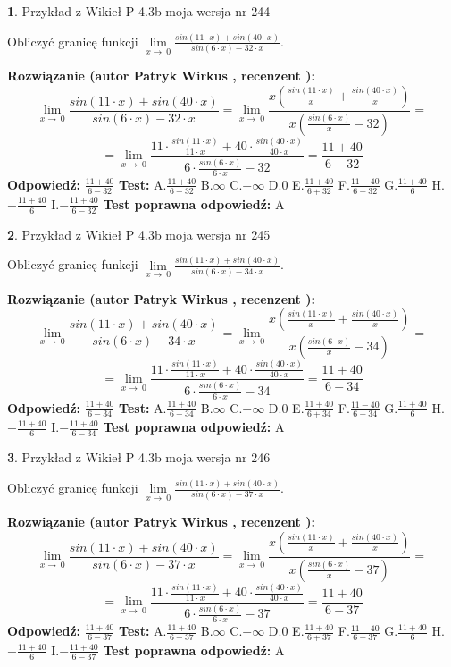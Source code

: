 \documentclass[12pt, a4paper]{article}
\theoremstyle{definition} %
\newtheorem{zad}{}
\newcommand{\zadStart}[1]{\begin{zad}#1\newline}
\newcommand{\zadStop}{\end{zad}}
\newcommand{\rozwStart}[2]{\noindent \textbf{Rozwiązanie (autor #1 , recenzent #2): }\newline}
\newcommand{\rozwStop}{\newline}
\newcommand{\odpStart}{\noindent \textbf{Odpowiedź:}\newline}
\newcommand{\odpStop}{\newline}
\newcommand{\testStart}{\noindent \textbf{Test:}\newline}
\newcommand{\testStop}{\newline}
\newcommand{\kluczStart}{\noindent \textbf{Test poprawna odpowiedź:}\newline}
\newcommand{\kluczStop}{\newline}
\begin{document}
\zadStart{Przykład z Wikieł P 4.3b moja wersja nr 244}


Obliczyć granicę funkcji $\lim\limits_{x\to\ 0}\frac{sin(11 \cdot x)+sin(40 \cdot x)}{sin(6 \cdot x)-32 \cdot x}$.
\zadStop
\rozwStart{Patryk Wirkus}{}
$$\lim\limits_{x\to\ 0}\frac{sin(11 \cdot x)+sin(40 \cdot x)}{sin(6 \cdot x)-32 \cdot x}=\lim\limits_{x\to\ 0}\frac{x(\frac{sin(11 \cdot x)}{x}+\frac{sin(40 \cdot x)}{x})}{x(\frac{sin(6 \cdot x)}{x}-32)}=$$
$$=\lim\limits_{x\to\ 0}\frac{11 \cdot \frac{sin(11 \cdot x)}{11 \cdot x}+40 \cdot \frac{sin(40 \cdot x)}{40 \cdot x}}{6 \cdot \frac{sin(6 \cdot x)}{6 \cdot x}-32}=\frac{11+40}{6-32}$$
\rozwStop
\odpStart
$\frac{11+40}{6-32}$
\odpStop
\testStart
A.$\frac{11+40}{6-32}$
B.$\infty$
C.$-\infty$
D.$0$
E.$\frac{11+40}{6+32}$
F.$\frac{11-40}{6-32}$
G.$\frac{11+40}{6}$
H.$-\frac{11+40}{6}$
I.$-\frac{11+40}{6-32}$
\testStop
\kluczStart
A
\kluczStop



\zadStart{Przykład z Wikieł P 4.3b moja wersja nr 245}


Obliczyć granicę funkcji $\lim\limits_{x\to\ 0}\frac{sin(11 \cdot x)+sin(40 \cdot x)}{sin(6 \cdot x)-34 \cdot x}$.
\zadStop
\rozwStart{Patryk Wirkus}{}
$$\lim\limits_{x\to\ 0}\frac{sin(11 \cdot x)+sin(40 \cdot x)}{sin(6 \cdot x)-34 \cdot x}=\lim\limits_{x\to\ 0}\frac{x(\frac{sin(11 \cdot x)}{x}+\frac{sin(40 \cdot x)}{x})}{x(\frac{sin(6 \cdot x)}{x}-34)}=$$
$$=\lim\limits_{x\to\ 0}\frac{11 \cdot \frac{sin(11 \cdot x)}{11 \cdot x}+40 \cdot \frac{sin(40 \cdot x)}{40 \cdot x}}{6 \cdot \frac{sin(6 \cdot x)}{6 \cdot x}-34}=\frac{11+40}{6-34}$$
\rozwStop
\odpStart
$\frac{11+40}{6-34}$
\odpStop
\testStart
A.$\frac{11+40}{6-34}$
B.$\infty$
C.$-\infty$
D.$0$
E.$\frac{11+40}{6+34}$
F.$\frac{11-40}{6-34}$
G.$\frac{11+40}{6}$
H.$-\frac{11+40}{6}$
I.$-\frac{11+40}{6-34}$
\testStop
\kluczStart
A
\kluczStop



\zadStart{Przykład z Wikieł P 4.3b moja wersja nr 246}


Obliczyć granicę funkcji $\lim\limits_{x\to\ 0}\frac{sin(11 \cdot x)+sin(40 \cdot x)}{sin(6 \cdot x)-37 \cdot x}$.
\zadStop
\rozwStart{Patryk Wirkus}{}
$$\lim\limits_{x\to\ 0}\frac{sin(11 \cdot x)+sin(40 \cdot x)}{sin(6 \cdot x)-37 \cdot x}=\lim\limits_{x\to\ 0}\frac{x(\frac{sin(11 \cdot x)}{x}+\frac{sin(40 \cdot x)}{x})}{x(\frac{sin(6 \cdot x)}{x}-37)}=$$
$$=\lim\limits_{x\to\ 0}\frac{11 \cdot \frac{sin(11 \cdot x)}{11 \cdot x}+40 \cdot \frac{sin(40 \cdot x)}{40 \cdot x}}{6 \cdot \frac{sin(6 \cdot x)}{6 \cdot x}-37}=\frac{11+40}{6-37}$$
\rozwStop
\odpStart
$\frac{11+40}{6-37}$
\odpStop
\testStart
A.$\frac{11+40}{6-37}$
B.$\infty$
C.$-\infty$
D.$0$
E.$\frac{11+40}{6+37}$
F.$\frac{11-40}{6-37}$
G.$\frac{11+40}{6}$
H.$-\frac{11+40}{6}$
I.$-\frac{11+40}{6-37}$
\testStop
\kluczStart
A
\kluczStop
\end{document}
